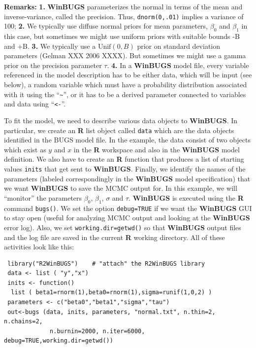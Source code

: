 {\bf Remarks:} {\bf 1.} {\bf WinBUGS} parameterizes the normal in
terms of the mean and inverse-variance, called the precision. Thus,
\mbox{\tt dnorm(0,.01)} implies a variance of 100; 
{\bf 2.} We typically use diffuse normal priors for mean parameters, $\beta_0$ and $\beta_1$ in this case, but sometimes we might use uniform priors with suitable bounds -B and +B.
{\bf 3.} We typically use a $\mbox{Unif}(0,B)$ prior on standard
deviation parameters 
(Gelman XXX 2006 XXXX). But sometimes we might use a gamma prior on the precision parameter $\tau$.
{\bf 4.} In a {\bf WinBUGS} model file, every variable referenced in
the model description has to be
either data, which will be input (see below), a random variable which
must have a probability distribution associated with it using the
``\verb#~#'', or it has to be a derived parameter connected to variables and
data using ``\mbox{\tt <-}''.


To fit the model, we need to describe various data objects to {\bf
  WinBUGS}. In particular, 
we create an {\bf R} list object called \mbox{\tt data} which
are the data objects identified in the BUGS model file.
 In the example, the 
data consist of two objects which exist as $y$ and $x$ in the {\bf R}
workspace and also in the {\bf WinBUGS} model definition. 
 We also have to create an {\bf R} function
that produces a list of starting values \mbox{\tt inits} that get sent to
{\bf WinBUGS}.
 Finally, we identify
the names of the parameters (labeled correspondingly in the {\bf WinBUGS}
model specification) that we want {\bf WinBUGS} to save the MCMC output
for. In this example, we will ``monitor'' the parameters 
$\beta_0$, $\beta_1$, $\sigma$ and $\tau$. 
{\bf WinBUGS} is executed using the {\bf R} command
\mbox{\tt bugs()}.
We set the option \mbox{\tt debug=TRUE} if we want the {\bf WinBUGS}
GUI to stay open (useful for analyzing MCMC output and looking at the
{\bf WinBUGS} error log). Also, we set \mbox{\tt working.dir=getwd()}
so that {\bf WinBUGS} output files and the log file are saved in the
current {\bf R} working directory.  
  All of these activities look like this:
{\small 
\begin{verbatim}
 library("R2WinBUGS")    # "attach" the R2WinBUGS library
 data <- list ( "y","x")
 inits <- function()
  list ( beta1=rnorm(1),beta0=rnorm(1),sigma=runif(1,0,2) )
 parameters <- c("beta0","beta1","sigma","tau")
 out<-bugs (data, inits, parameters, "normal.txt", n.thin=2, n.chains=2, 
             n.burnin=2000, n.iter=6000, debug=TRUE,working.dir=getwd())
\end{verbatim}
}

